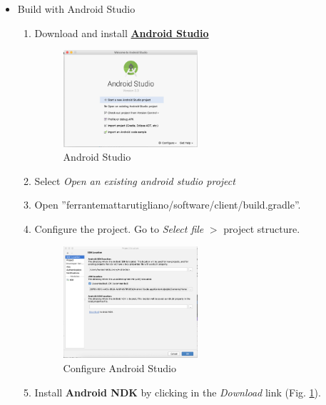 \documentclass[a4paper, hidelinks, 12pt]{report}
\begin{document}
	\begin{itemize}
		\item  Build with Android Studio 
	
		\begin{enumerate}
			\item Download and install  \href{https://developer.android.com/studio/}{\textbf{Android Studio}}
			
			\begin{figure}[H]
					\centering
				\includegraphics[width=0.5\textwidth]{images/android_studio.png}
					\caption[Android Studio]{Android Studio}
				\label{fig:android_studio}
			\end{figure}
			
			\item Select \textit{Open an existing android studio project} 
			\item Open ”ferrantemattarutigliano/software/client/build.gradle”.
			
			\item Configure the project. Go to  \textit{Select file} $>$ project structure. 
			
			\begin{figure}[H]
					\centering
				\includegraphics[width=0.5\textwidth]{images/project_structure.png}
					\caption[Configure Project Structure]{ Configure Android Studio}
				\label{fig:project_structure}
			\end{figure}
			
			\item Install \textbf{Android NDK} by clicking in the \textit{Download} link (Fig. \ref{fig:android_studio}).
			

\end{enumerate}
\end{itemize}
\end{document}
